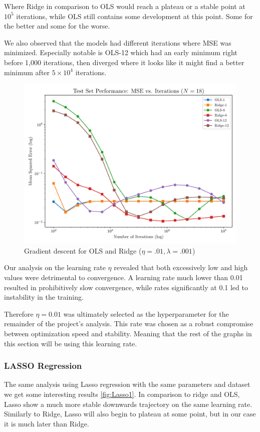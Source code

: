 \documentclass[twocolumn,aps]{revtex4}
\begin{document}
Where Ridge in comparison to OLS would reach a plateau or a stable point at $10^5$ iterations, while OLS still contains some development at this point. 
Some for the better and some for the worse.

We also observed that the models had different iterations where MSE was minimized.
Especially notable is OLS-12 which had an early minimum right before 1,000 iterations, then diverged where it looks like it might find a better minimum after $5 \times 10^4$ iterations.

\begin{figure}[h]
    \centering
    \includegraphics[width=.95 \linewidth]{Figures/Gradient_Comparison_OLS_Ridge_18.pdf}
    \caption{Gradient descent for OLS and Ridge ($\eta=.01, \lambda=.001$)}
    \label{fig:DescOLSRidge}
\end{figure}
Our analysis on the learning rate $\eta$ revealed that both excessively low and high values were detrimental to convergence.
A learning rate much lower than 0.01 resulted in prohibitively slow convergence, while rates significantly at 0.1 led to instability in the training.

Therefore $\eta=0.01$ was ultimately selected as the hyperparameter for the remainder of the project's analysis. 
This rate was chosen as a robust compromise between optimization speed and stability.
Meaning that the rest of the graphs in this section will be using this learning rate.


\subsubsection{LASSO Regression}
The same analysis using Lasso regression with the same parameters and dataset we get some interesting results \ref{fig:Lasso1}.
In comparison to ridge and OLS, Lasso show a much more stable downwards trajectory on the same learning rate.
Similarly to Ridge, Lasso will also begin to plateau at some point, but in our case it is much later than Ridge.
\end{document}
